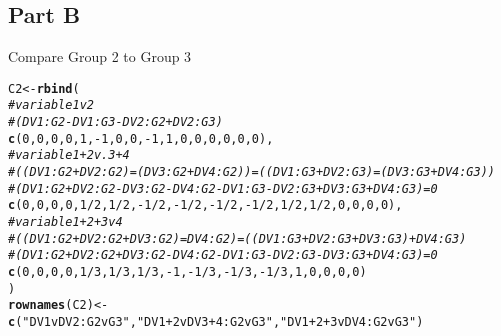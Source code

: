 \documentclass{article}\usepackage[]{graphicx}\usepackage[]{color}
\makeatletter
\newcommand{\hlnum}[1]{\textcolor[rgb]{0.686,0.059,0.569}{#1}}%
\newcommand{\hlstr}[1]{\textcolor[rgb]{0.192,0.494,0.8}{#1}}%
\newcommand{\hlcom}[1]{\textcolor[rgb]{0.678,0.584,0.686}{\textit{#1}}}%
\newcommand{\hlopt}[1]{\textcolor[rgb]{0,0,0}{#1}}%
\newcommand{\hlstd}[1]{\textcolor[rgb]{0.345,0.345,0.345}{#1}}%
\newcommand{\hlkwb}[1]{\textcolor[rgb]{0.69,0.353,0.396}{#1}}%
\newcommand{\hlkwd}[1]{\textcolor[rgb]{0.737,0.353,0.396}{\textbf{#1}}}%
\newenvironment{kframe}{%
 \def\at@end@of@kframe{}%
 \ifinner\ifhmode%
  \def\at@end@of@kframe{\end{minipage}}%
  \begin{minipage}{\columnwidth}%
 \fi\fi%
 \def\FrameCommand##1{\hskip\@totalleftmargin \hskip-\fboxsep
 \colorbox{shadecolor}{##1}\hskip-\fboxsep
     \hskip-\linewidth \hskip-\@totalleftmargin \hskip\columnwidth}%
 \MakeFramed {\advance\hsize-\width
   \@totalleftmargin\z@ \linewidth\hsize
   \@setminipage}}%
 {\par\unskip\endMakeFramed%
 \at@end@of@kframe}
\newenvironment{knitrout}{}{} %
\makeatother
\begin{document}
\subsection{Part B}
Compare Group 2 to Group 3
\begin{knitrout}
\color{fgcolor}\begin{kframe}
\begin{alltt}
\hlstd{C2} \hlkwb{<-} \hlkwd{rbind}\hlstd{(}
  \hlcom{# variable 1 v 2}
  \hlcom{# (DV1:G2 - DV1:G3 - DV2:G2 + DV2:G3)}
  \hlkwd{c}\hlstd{(}\hlnum{0}\hlstd{,}\hlnum{0}\hlstd{,}\hlnum{0}\hlstd{,}\hlnum{0}\hlstd{,} \hlnum{1}\hlstd{,}\hlopt{-}\hlnum{1}\hlstd{,}\hlnum{0}\hlstd{,}\hlnum{0}\hlstd{,} \hlopt{-}\hlnum{1}\hlstd{,}\hlnum{1}\hlstd{,}\hlnum{0}\hlstd{,}\hlnum{0}\hlstd{,} \hlnum{0}\hlstd{,}\hlnum{0}\hlstd{,}\hlnum{0}\hlstd{,}\hlnum{0}\hlstd{),}
  \hlcom{# variable 1+2 v. 3+4}
  \hlcom{# ((DV1:G2 + DV2:G2) = (DV3:G2 + DV4:G2)) = ((DV1:G3 + DV2:G3) = (DV3:G3 + DV4:G3))}
  \hlcom{# (DV1:G2 + DV2:G2 -DV3:G2 -DV4:G2 -DV1:G3 - DV2:G3 + DV3:G3 + DV4:G3) = 0}
  \hlkwd{c}\hlstd{(}\hlnum{0}\hlstd{,}\hlnum{0}\hlstd{,}\hlnum{0}\hlstd{,}\hlnum{0}\hlstd{,} \hlnum{1}\hlopt{/}\hlnum{2}\hlstd{,} \hlnum{1}\hlopt{/}\hlnum{2}\hlstd{,}\hlopt{-}\hlnum{1}\hlopt{/}\hlnum{2}\hlstd{,}\hlopt{-}\hlnum{1}\hlopt{/}\hlnum{2}\hlstd{,} \hlopt{-}\hlnum{1}\hlopt{/}\hlnum{2}\hlstd{,}\hlopt{-}\hlnum{1}\hlopt{/}\hlnum{2}\hlstd{,}\hlnum{1}\hlopt{/}\hlnum{2}\hlstd{,}\hlnum{1}\hlopt{/}\hlnum{2}\hlstd{,} \hlnum{0}\hlstd{,}\hlnum{0}\hlstd{,}\hlnum{0}\hlstd{,}\hlnum{0}\hlstd{),}
  \hlcom{# variable 1+2+3 v 4}
  \hlcom{# ((DV1:G2 + DV2:G2 + DV3:G2) = DV4:G2) = ((DV1:G3 + DV2:G3 + DV3:G3) + DV4:G3)}
  \hlcom{# (DV1:G2 + DV2:G2 + DV3:G2 - DV4:G2 - DV1:G3 - DV2:G3 -DV3:G3 + DV4:G3) = 0}
  \hlkwd{c}\hlstd{(}\hlnum{0}\hlstd{,}\hlnum{0}\hlstd{,}\hlnum{0}\hlstd{,}\hlnum{0}\hlstd{,} \hlnum{1}\hlopt{/}\hlnum{3}\hlstd{,}\hlnum{1}\hlopt{/}\hlnum{3}\hlstd{,}\hlnum{1}\hlopt{/}\hlnum{3}\hlstd{,}\hlopt{-}\hlnum{1}\hlstd{,} \hlopt{-}\hlnum{1}\hlopt{/}\hlnum{3}\hlstd{,}\hlopt{-}\hlnum{1}\hlopt{/}\hlnum{3}\hlstd{,}\hlopt{-}\hlnum{1}\hlopt{/}\hlnum{3}\hlstd{,}\hlnum{1}\hlstd{,} \hlnum{0}\hlstd{,}\hlnum{0}\hlstd{,}\hlnum{0}\hlstd{,}\hlnum{0}\hlstd{)}
\hlstd{)}
\hlkwd{rownames}\hlstd{(C2)} \hlkwb{<-} \hlkwd{c}\hlstd{(}\hlstr{"DV1vDV2:G2vG3"}\hlstd{,} \hlstr{"DV1+2vDV3+4:G2vG3"}\hlstd{,} \hlstr{"DV1+2+3vDV4:G2vG3"}\hlstd{)}
\end{alltt}
\end{kframe}
\end{knitrout}
\end{document}
